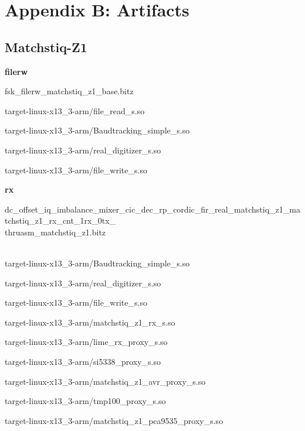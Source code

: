 \section{Appendix B: Artifacts}
\subsection{Matchstiq-Z1}
	\noindent\textbf{filerw}
	\begin{itemize}
	\begin{minipage}[t]{.5\textwidth}
	\item fsk\_filerw\_matchstiq\_z1\_base.bitz
	\item target-linux-x13\_3-arm/file\_read\_s.so
	\item target-linux-x13\_3-arm/Baudtracking\_simple\_s.so
	\end{minipage}
	\begin{minipage}[t]{.5\textwidth}
	\item target-linux-x13\_3-arm/real\_digitizer\_s.so
	\item target-linux-x13\_3-arm/file\_write\_s.so
	\end{minipage}
	\end{itemize}

	\noindent\textbf{rx}
	\begin{itemize}
	\item dc\_offset\_iq\_imbalance\_mixer\_cic\_dec\_rp\_cordic\_fir\_real\_matchstiq\_z1\_matchstiq\_z1\_rx\_cnt\_1rx\_0tx\_ \\ thruasm\_matchstiq\_z1.bitz \\ \\
	\begin{minipage}[t]{.5\textwidth}\item target-linux-x13\_3-arm/Baudtracking\_simple\_s.so
	\item target-linux-x13\_3-arm/real\_digitizer\_s.so
	\item target-linux-x13\_3-arm/file\_write\_s.so
	\item target-linux-x13\_3-arm/matchstiq\_z1\_rx\_s.so
	\item target-linux-x13\_3-arm/lime\_rx\_proxy\_s.so
	\end{minipage}
	\begin{minipage}[t]{.5\textwidth}	\item target-linux-x13\_3-arm/si5338\_proxy\_s.so
	\item target-linux-x13\_3-arm/matchstiq\_z1\_avr\_proxy\_s.so
	\item target-linux-x13\_3-arm/tmp100\_proxy\_s.so
	\item target-linux-x13\_3-arm/matchstiq\_z1\_pca9535\_proxy\_s.so
	\end{minipage}
	\end{itemize}

